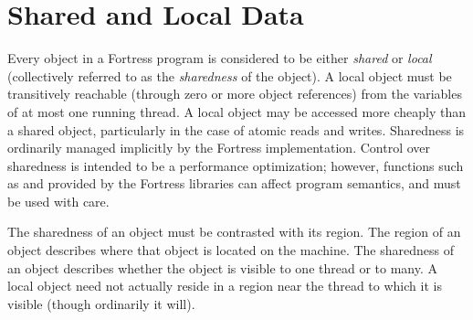 %
%
%
%

\section{Shared and Local Data}


Every object in a Fortress program is considered to be either
\emph{shared} or \emph{local} (collectively referred to as the
\emph{sharedness} of the object).  A local object must be transitively
reachable (through zero or more object references) from the variables
of at most one running thread.  A local object may be accessed more
cheaply than a shared object, particularly in the case of atomic reads
and writes.  Sharedness is ordinarily managed implicitly by the
Fortress implementation.
Control over sharedness is intended to be a
performance optimization; however, functions such as  and
 provided by the Fortress libraries
can affect program semantics, and must be used with care.

The sharedness of an object must be contrasted with its region.  The
region of an object describes where that object is located on the
machine.  The sharedness of an object describes whether the object is
visible to one thread or to many.  A local object need not actually
reside in a region near the thread to which it is visible (though
ordinarily it will).

